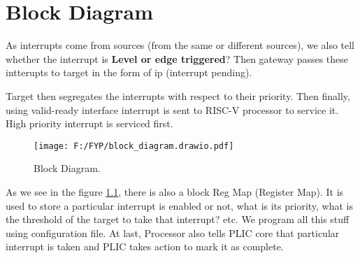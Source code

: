 
\chapter{Block Diagram}
\label{Chapter7}

As interrupts come from sources (from the same or different sources), we also tell whether the interrupt is \textbf{ Level or edge triggered}? Then gateway passes these intterupts to target in the form of ip (interrupt  pending).

\par
Target then segregates the interrupts with respect to their priority. Then finally, using valid-ready interface  interrupt is sent to RISC-V processor to service it. High priority interrupt is serviced first.

\begin{figure}[h]
  \centering
  \texttt{[image: F:/FYP/block\_diagram.drawio.pdf]}
  \caption{Block Diagram.}
  \label{fig:block_diagram}
\end{figure}


As we see in the figure \ref{fig:block_diagram}, there is also a block Reg Map (Register Map). It is used to store a particular interrupt is enabled or not, what is its priority, what is the threshold of the target to take that interrupt? etc. We program all this stuff using configuration file. At last, Processor also tells PLIC core that particular interrupt is taken and PLIC takes action to mark it as complete. 
